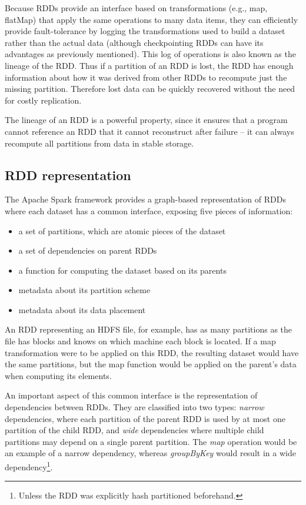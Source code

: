 \documentclass{l4proj}
\begin{document}
Because RDDs provide an interface based on transformations (e.g., map, flatMap) that apply the same operations to many data items, they can efficiently provide fault-tolerance by logging the transformations used to build a dataset rather than the actual data (although checkpointing RDDs can have its advantages as previously mentioned). This log of operations is also known as the lineage of the RDD. Thus if a partition of an RDD is lost, the RDD has enough information about how it was derived from other RDDs to recompute just the missing partition\cite{RDD}. Therefore lost data can be quickly recovered without the need for costly replication.

The lineage of an RDD is a powerful property, since it ensures that a program cannot reference an RDD that it cannot reconstruct after failure -- it can always recompute all partitions from data in stable storage.

\subsection{RDD representation}

The Apache Spark framework provides a graph-based representation of RDDs where each dataset has a common interface, exposing five pieces of information:

\begin{itemize}
\renewcommand{\labelitemi}{\scriptsize$\blacksquare$}
\item a set of partitions, which are atomic pieces of the dataset
\item a set of dependencies on parent RDDs
\item a function for computing the dataset based on its parents
\item metadata about its partition scheme
\item metadata about its data placement
\end{itemize}

An RDD representing an HDFS file, for example, has as many partitions as the file has blocks and knows on which machine each block is located. If a map transformation were to be applied on this RDD, the resulting dataset would have the same partitions, but the map function would be applied on the parent's data when computing its elements.

An important aspect of this common interface is the representation of dependencies between RDDs. They are classified into two types: \textit{narrow} dependencies, where each partition of the parent RDD is used by at most one partition of the child RDD, and \textit{wide} dependencies where multiple child partitions may depend on a single parent partition\cite{RDD}. The \textit{map} operation would be an example of a narrow dependency, whereas \textit{groupByKey} would result in a wide dependency\footnote{Unless the RDD was explicitly hash partitioned beforehand.}.
\end{document}

